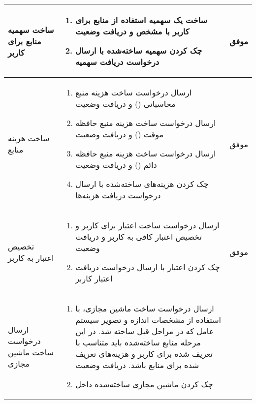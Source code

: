 \begin{center}
\begin{longtable}{ | P{2cm} | P{11cm} | c | }
ساخت سهمیه منابع برای کاربر&
{\footnotesize
	\begin{enumerate}[rightmargin=1cm,topsep=0pt,partopsep=0pt]
		\item ساخت یک سهمیه استفاده از منابع برای کاربر با  مشخص و دریافت وضعیت 
		
		\item چک کردن سهمیه ساخته‌شده با ارسال درخواست دریافت سهمیه
	\end{enumerate}
} &
موفق \\ \hline

ساخت هزینه منابع&
{\footnotesize
	\begin{enumerate}[rightmargin=1cm,topsep=0pt,partopsep=0pt]
		\item ارسال درخواست ساخت هزینه منبع محاسباتی () و دریافت وضعیت 
		
		\item ارسال درخواست ساخت هزینه منبع حافظه موقت () و دریافت وضعیت 
		
		\item ارسال درخواست ساخت هزینه منبع حافظه دائم () و دریافت وضعیت 
		
		\item چک کردن هزینه‌های ساخته‌شده با ارسال درخواست دریافت هزینه‌ها
	\end{enumerate}
} &
موفق \\ \hline

تخصیص اعتبار به کاربر&
{\footnotesize
	\begin{enumerate}[rightmargin=1cm,topsep=0pt,partopsep=0pt]
		\item ارسال درخواست ساخت اعتبار برای کاربر و تخصیص اعتبار کافی به کاربر و دریافت وضعیت 
				
		\item چک کردن اعتبار با ارسال درخواست دریافت اعتبار کاربر
	\end{enumerate}
} &
موفق \\ \hline

ارسال درخواست ساخت ماشین مجازی&
{\footnotesize
	\begin{enumerate}[rightmargin=1cm,topsep=0pt,partopsep=0pt]
		\item ارسال درخواست ساخت ماشین مجازی، با استفاده از مشخصات اندازه و تصویر سیستم عامل که در مراحل قبل ساخته شد. در این مرحله منابع ساخته‌شده باید متناسب با  تعریف شده برای کاربر و هزینه‌های تعریف شده برای منابع باشد. دریافت وضعیت 
		
		\item چک کردن ماشین مجازی ساخته‌شده داخل 
		

\end{enumerate}}
\end{longtable}
\end{center}
